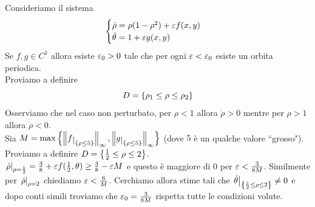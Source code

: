 \begin{example}
Consideriamo il sistema
\[\begin{cases}
\dot \rho=\rho(1-\rho^2) + \varepsilon f(x,y)\\
\dot \theta=1+\varepsilon g(x,y)
\end{cases}\]
Se $f,g\in C^1$ allora esiste $\varepsilon_0>0$ tale che per ogni $\varepsilon<\varepsilon_0$ esiste un orbita periodica.\\
Proviamo a definire
\[D=\left\{{\rho_1\leq\rho\leq\rho_2}\right\}\]
Osserviamo che nel caso non perturbato, per $\rho<1$ allora $\dot \rho>0$ mentre per $\rho>1$ allora $\dot \rho<0$.\\
Sia $M=\max\cpa{\norm {f\res{\cpa{\rho\leq 5}}}_\infty, \norm {g\res{\cpa{\rho\leq 5}}}_\infty}$ (dove $5$ \`e un qualche valore ``grosso"). Proviamo a definire $D=\left\{{\frac12\leq \rho\leq 2}\right\}$.\\
$\left.{\dot \rho}\right|_{\rho=\frac12}=\frac38+\varepsilon f(\frac12,\theta)\geq \frac38-\varepsilon M$ e questo \`e maggiore di $0$ per $\varepsilon<\frac3{8M}$.
Similmente per $\left.{\dot \rho}\right|_{\rho=2}$ chiediamo $\varepsilon<\frac6M$. Cerchiamo allora stime tali che
$\left.{\dot \theta}\right|_{\left\{{\frac12\leq \rho\leq 2}\right\}}\neq 0$ e dopo conti simili troviamo che $\varepsilon_0=\frac3{8M}$ rispetta tutte le condizioni volute.
\end{example}
